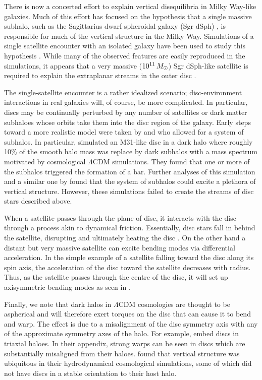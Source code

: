 There is now a concerted effort to explain vertical disequilibria in
Milky Way-like galaxies. Much of this effort has focused on the
hypothesis that a single massive subhalo, such as the Sagittarius
dwarf spheroidal galaxy (Sgr dSph) \citep{ibata_discovery}, is
responsible for much of the vertical structure in the Milky
Way. Simulations of a single satellite encounter with an isolated
galaxy have been used to study this hypothesis \citep[for
  example]{purcell2011,gomez_2013,widrow_2014,feldmann_2015, dlv_2015,
  donghia_2016, laporte_2016, laporte_2018, laporte_2018_b}. While
many of the observed features are easily reproduced in the
simulations, it appears that a very massive ($10^{11}\,M_\odot$) Sgr
dSph-like satellite is required to explain the extraplanar streams in
the outer disc \citep{laporte_2018_b}.

The single-satellite encounter is a rather idealized scenario;
disc-environment interactions in real galaxies will, of course, be
more complicated. In particular, discs may be continually perturbed by
any number of satellites or dark matter subhaloes whose orbits take
them into the disc region of the galaxy. Early steps toward a more
realistic model were taken by \citet{font_2001} and
\citet{gauthier_2006} who allowed for a system of subhalos. In
particular, \citet{gauthier_2006} simulated an M31-like disc in a dark
halo where roughly 10\% of the smooth halo mass was replace by dark
subhalos with a mass spectrum motivated by cosmological $\Lambda$CDM
simulations. They found that one or more of the subhalos triggered the
formation of a bar. Further analyses of this simulation and a similar
one by \citet{chequers_2018} found that the system of subhalos could
excite a plethora of vertical structure. However, these simulations
failed to create the streams of disc stars described above.

When a satellite passes through the plane of disc, it interacts with
the disc through a process akin to dynamical friction. Essentially,
disc stars fall in behind the satellite, disrupting and ultimately
heating the disc \citep{sellwood_1998}. On the other hand a distant
but very massive satellite can excite bending modes via differential
acceleration. In the simple example of a satellite falling toward the
disc along its spin axis, the acceleration of the disc toward the
satellite decreases with radius. Thus, as the satellite passes
through the centre of the disc, it will set up axisymmetric bending
modes as seen in \citet{sellwood_1996}.

Finally, we note that dark halos in $\Lambda$CDM cosmologies are
thought to be aspherical and will therefore exert torques on the disc
that can cause it to bend and warp. The effect is due to a
misalignment of the disc symmetry axis with any of the approximate
symmetry axes of the halo. For example, \citet{hu_2016} embed discs
in triaxial haloes. In their appendix, strong warps can be seen in
discs which are substantially misaligned from their
haloes. \citet{gomez_2017} found that vertical structure was
ubiquitous in their hydrodynamical cosmological simulations, some of
which did not have discs in a stable orientation to their host halo.

